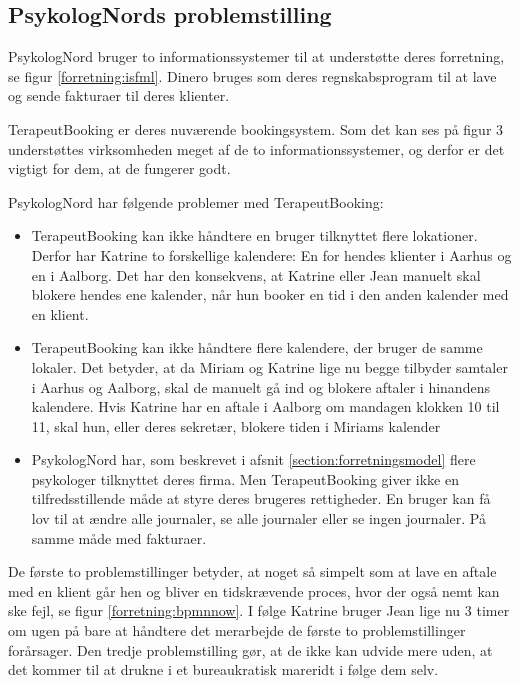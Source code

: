 \subsection{PsykologNords problemstilling}
\label{section:problemstilling}

PsykologNord bruger to informationssystemer til at understøtte deres forretning, se figur \ref{forretning:isfml}.
Dinero bruges som deres regnskabsprogram til at lave og sende fakturaer til deres klienter.

TerapeutBooking er deres nuværende bookingsystem.
Som det kan ses på figur 3 understøttes virksomheden meget af de to informationssystemer, og derfor er det vigtigt for dem, at de fungerer godt.

PsykologNord har følgende problemer med TerapeutBooking:

\begin{itemize}
    \item TerapeutBooking kan ikke håndtere en bruger tilknyttet flere lokationer.
    Derfor har Katrine to forskellige kalendere: En for hendes klienter i Aarhus og en i Aalborg.
    Det har den konsekvens, at Katrine eller Jean manuelt skal blokere hendes ene kalender, når hun booker en tid i den anden kalender med en klient.
    
    \item TerapeutBooking kan ikke håndtere flere kalendere, der bruger de samme lokaler.
    Det betyder, at da Miriam og Katrine lige nu begge tilbyder samtaler i Aarhus og Aalborg, skal de manuelt gå ind og blokere aftaler i hinandens kalendere.
    Hvis Katrine har en aftale i Aalborg om mandagen klokken 10 til 11, skal hun, eller deres sekretær, blokere tiden i Miriams kalender
    
   \item PsykologNord har, som beskrevet i afsnit \ref{section:forretningsmodel} flere psykologer tilknyttet deres firma.
   Men TerapeutBooking giver ikke en tilfredsstillende måde at styre deres brugeres rettigheder.
   En bruger kan få lov til at ændre alle journaler, se alle journaler eller se ingen journaler.
   På samme måde med fakturaer.
\end{itemize}

De første to problemstillinger betyder, at noget så simpelt som at lave en aftale med en klient går hen og bliver en tidskrævende proces, hvor der også nemt kan ske fejl, se figur \ref{forretning:bpmnnow}.
I følge Katrine bruger Jean lige nu 3 timer om ugen på bare at håndtere det merarbejde de første to problemstillinger forårsager.
Den tredje problemstilling gør, at de ikke kan udvide mere uden, at det kommer til at drukne i et bureaukratisk mareridt i følge dem selv.

